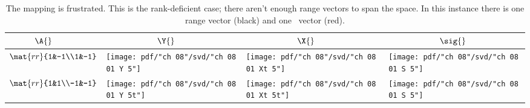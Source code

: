 \break
\clearpage
\begin{landscape}
\thispagestyle{empty}
\begin{table}[htdp]
\begin{center}
\begin{tabular}{m{0.75in}m{1.75in}m{1.75in}m{1.75in}}
  $ \quad \qquad \A{}$ & $\qquad \qquad \qquad \Y{}$ & $\qquad \qquad \qquad \X{}$ & $\qquad \qquad \qquad \sig{}$ \\ \hline\hline
  $\mat{rr}{1&-1\\1&-1}$ \qquad & \qquad 
  \texttt{[image: pdf/"ch 08"/svd/"ch 08 01 Y 5"]} \qquad & \qquad 
  \texttt{[image: pdf/"ch 08"/svd/"ch 08 01 Xt 5"]} \qquad & \qquad 
  \texttt{[image: pdf/"ch 08"/svd/"ch 08 01 S 5"]} \\
  $\mat{rr}{1&1\\-1&-1}$ \qquad & \qquad 
  \texttt{[image: pdf/"ch 08"/svd/"ch 08 01 Y 5t"]} \qquad & \qquad 
  \texttt{[image: pdf/"ch 08"/svd/"ch 08 01 Xt 5t"]} \qquad & \qquad 
  \texttt{[image: pdf/"ch 08"/svd/"ch 08 01 S 5"]} \\
\end{tabular}
\end{center}
\caption[The mapping is frustrated]{The mapping is frustrated. This is the rank-deficient case; there aren't enough range vectors to span the space. In this instance there is one range vector (black) and one \ns \ vector (red).}
\label{tab:8:visualse}
\end{table}%
\end{landscape}

\endinput
